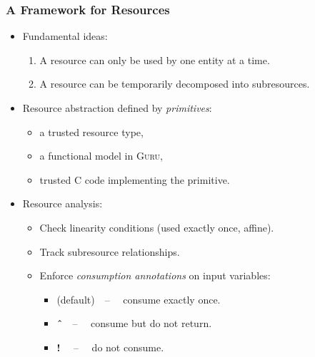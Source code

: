 \documentclass[10pt]{beamer}
\begin{document}
\begin{frame}
  \frametitle{A Framework for Resources}

\begin{itemize}

\item Fundamental ideas:

\begin{enumerate}
\item A resource can only be used by one entity at a time.
\item A resource can be temporarily decomposed into subresources.
\end{enumerate}

\item Resource abstraction defined by \emph{primitives}:

\begin{itemize}
\item a trusted resource type,
\item a functional model in \textsc{Guru},
\item trusted C code implementing the primitive.
\end{itemize}

\item Resource analysis:
\begin{itemize}
\item Check linearity conditions (used exactly once, affine).
\item Track subresource relationships.
\item Enforce \emph{consumption annotations} on input variables:
\begin{itemize}
\item (default)\ \ -- \ \ consume exactly once.
\item \textbf{\^{\ }}\ \ -- \ \  consume but do not return.
\item \textbf{!} \ \ -- \ \  do not consume.
\end{itemize}
\end{itemize}

\end{itemize}

\end{frame}
\end{document}
